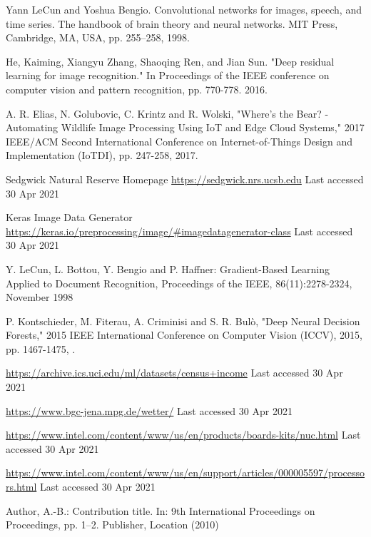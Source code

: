 \documentclass[runningheads]{llncs}
\begin{document}
\begin{thebibliography}{8}

Yann LeCun and Yoshua Bengio. Convolutional networks for images, speech, and time series. The handbook of brain theory and neural networks. MIT Press, Cambridge, MA, USA, pp. 255–258, 1998.

He, Kaiming, Xiangyu Zhang, Shaoqing Ren, and Jian Sun. "Deep residual learning for image recognition." In Proceedings of the IEEE conference on computer vision and pattern recognition, pp. 770-778. 2016.

A. R. Elias, N. Golubovic, C. Krintz and R. Wolski, "Where's the Bear? - Automating Wildlife Image Processing Using IoT and Edge Cloud Systems," 2017 IEEE/ACM Second International Conference on Internet-of-Things Design and Implementation (IoTDI), pp. 247-258, 2017.

Sedgwick Natural Reserve Homepage \url{https://sedgwick.nrs.ucsb.edu} Last accessed 30 Apr 2021


Keras Image Data Generator \url{https://keras.io/preprocessing/image/\#imagedatagenerator-class} Last accessed 30 Apr 2021


Y. LeCun, L. Bottou, Y. Bengio and P. Haffner: Gradient-Based Learning Applied to Document Recognition, Proceedings of the IEEE, 86(11):2278-2324, November 1998

P. Kontschieder, M. Fiterau, A. Criminisi and S. R. Bulò, "Deep Neural Decision Forests," 2015 IEEE International Conference on Computer Vision (ICCV), 2015, pp. 1467-1475, .

\url{https://archive.ics.uci.edu/ml/datasets/census+income} Last accessed 30 Apr 2021

\url{https://www.bgc-jena.mpg.de/wetter/} Last accessed 30 Apr 2021 

\url{https://www.intel.com/content/www/us/en/products/boards-kits/nuc.html} Last accessed 30 Apr 2021 


\url{https://www.intel.com/content/www/us/en/support/articles/000005597/processors.html} Last accessed 30 Apr 2021 


Author, A.-B.: Contribution title. In: 9th International Proceedings
on Proceedings, pp. 1--2. Publisher, Location (2010)

\end{thebibliography}
\end{document}
